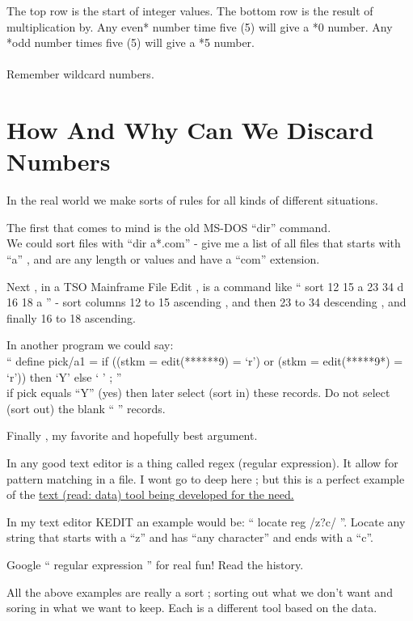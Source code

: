 \documentclass[12pt,letterpaper,oneside,titlepage]{article}
\begin{document}
\par 
The top row is the start of integer values. The bottom row is the result of multiplication by. Any even* number time five (5) will give a *0 number. Any *odd number times five (5) will give a *5 number. 
\\
\\
Remember wild\textendash card numbers.
\pagebreak




\section{How And Why Can We Discard Numbers}
\par 
\tab In the real world we make sorts of rules for all kinds of different situations. 
\\
\par 
The first that comes to mind is the old MS-DOS ``dir'' command.
\\
 We could sort files with ``dir a*.com'' - give me a list of all files that starts with ``a'' , and are any length or values and have a ``com'' extension.
\\
\par 
Next ,  in a TSO Mainframe File Edit , is a command like `` sort 12 15 a 23 34 d 16 18 a '' - sort columns 12 to 15 ascending , and then 23 to 34 descending , and finally 16 to 18 ascending.
\\
\par 
In another program we could say:
\\
`` define pick/a1 = if ((stkm = edit(******9) = `r') or (stkm = edit(*****9*) = `r')) then `Y' else ` ' ;  ''
\\ 
if pick equals ``Y'' (yes) then later select (sort in) these records. Do not select (sort out) the blank `` '' records.
\\
\par 
Finally , my favorite and hopefully best argument.
\\
\par 
In any good text editor is a thing called regex (regular expression). It allow for pattern matching in a file.
 I wont go to deep here ; but this is a perfect example of the \underline{text (read: data) tool being developed for the need.}
\\
\par 
In my text editor KEDIT an example would be: `` locate reg /z?c/ ''. Locate any string that starts with a ``z'' and has ``any character'' and ends with a ``c''.
\\
\par
Google `` regular expression '' for real fun! Read the history.
\\
\par 
All the above examples are really a sort ; sorting out what we don't want and soring in what we want to keep. Each is a different tool based on the data.
\\
\par
\end{document}
